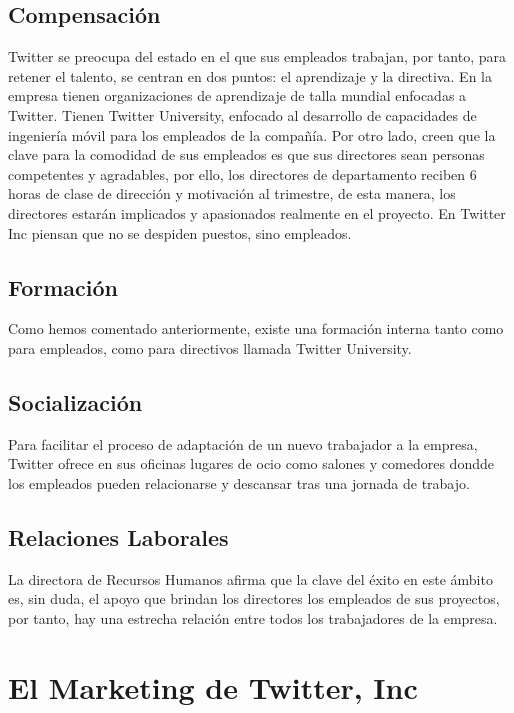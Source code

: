 \subsection{Compensación}

Twitter se preocupa del estado en el que sus empleados trabajan, por tanto, para retener el talento, se centran en dos puntos: el aprendizaje y la directiva.
En la empresa tienen organizaciones de aprendizaje de talla mundial enfocadas a Twitter. Tienen Twitter University, enfocado al desarrollo de capacidades de ingeniería móvil para los empleados de la compañía. Por otro lado, creen que la clave para la comodidad de sus empleados es que sus directores sean personas competentes y agradables, por ello, los directores de departamento reciben 6 horas de clase de dirección y motivación al trimestre, de esta manera, los directores estarán implicados y apasionados realmente en el proyecto. En Twitter Inc piensan que no se despiden puestos, sino empleados.

\subsection{Formación}

Como hemos comentado anteriormente, existe una formación interna tanto como para empleados, como para directivos llamada Twitter University.

\subsection{Socialización}

Para facilitar el proceso de adaptación de un nuevo trabajador a la empresa, Twitter ofrece en sus oficinas lugares de ocio como salones y comedores dondde los empleados pueden relacionarse y descansar tras una jornada de trabajo.

\subsection{Relaciones Laborales}

La directora de Recursos Humanos afirma que la clave del éxito en este ámbito es, sin duda, el apoyo que brindan los directores los empleados de sus proyectos, por tanto, hay una estrecha relación entre todos los trabajadores de la empresa.

\section{El Marketing de Twitter, Inc}

